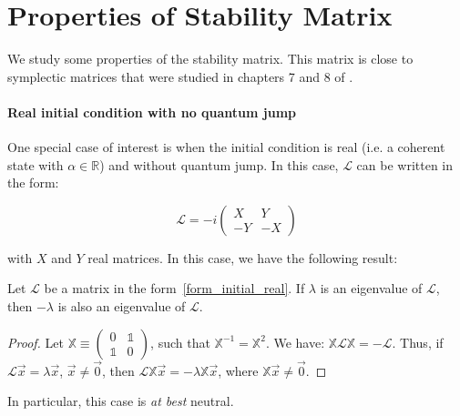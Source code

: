 \section{Properties of Stability Matrix} \label{ppties-L}

We study some properties of the stability matrix. This matrix is close to symplectic matrices that were studied in chapters 7 and 8 of \cite{elie-these}.

\paragraph{Real initial condition with no quantum jump} One special case of interest is when the initial condition is real (i.e. a coherent state with $\alpha \in \mathbb{R}$) and without quantum jump. In this case, $\mathcal{L}$ can be written in the form:

\begin{equation} \label{form_initial_real}
    \mathcal{L} = -i \begin{pmatrix}
        X & Y\\
        -Y & -X
    \end{pmatrix}
\end{equation}

with $X$ and $Y$ real matrices. In this case, we have the following result:

\begin{theorem}
    Let $\mathcal{L}$ be a matrix in the form~\autoref{form_initial_real}. If $\lambda$ is an eigenvalue of $\mathcal{L}$, then $-\lambda$ is also an eigenvalue of $\mathcal{L}$.
\end{theorem}

\begin{proof}
    Let $\mathbb{X} \equiv \begin{pmatrix}
        0 & \mathbb{1}\\
        \mathbb{1} & 0
    \end{pmatrix}$, such that $\mathbb{X}^{-1} = \mathbb{X}^2$. We have: $\mathbb{X} \mathcal{L} \mathbb{X} = - \mathcal{L}$. Thus, if $\mathcal{L} \Vec{x} = \lambda \Vec{x}$, $\Vec{x} \neq \Vec{0}$, then $\mathcal{L} \mathbb{X} \Vec{x} = -\lambda \mathbb{X} \Vec{x}$, where $\mathbb{X} \Vec{x} \neq \Vec{0}$.
\end{proof}

\begin{corollary}
    In particular, this case is \textit{at best} neutral.
\end{corollary}


